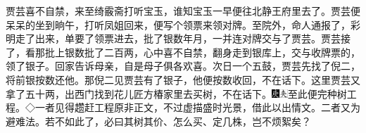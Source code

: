 贾芸喜不自禁，来至绮霰斋打听宝玉，谁知宝玉一早便往北静王府里去了。贾芸便呆呆的坐到晌午，打听凤姐回来，便写个领票来领对牌。至院外，命人通报了，彩明走了出来，单要了领票进去，批了银数年月，一并连对牌交与了贾芸。贾芸接了，看那批上银数批了二百两，心中喜不自禁，翻身走到银库上，交与收牌票的，领了银子。回家告诉母亲，自是母子俱各欢喜。次日一个五鼓，贾芸先找了倪二，将前银按数还他。那倪二见贾芸有了银子，他便按数收回，不在话下。这里贾芸又拿了五十两，出西门找到花儿匠方椿家里去买树，不在话下。{\includegraphics[width=3mm]{../Images/00004}\includegraphics[width=3mm]{../Images/00012}\footnotesize \kaishu 至此便完种树工程。◇一者见得趱赶工程原非正文，不过虚描盛时光景，借此以出情文。二者又为避难法。若不如此了，必曰其树其价、怎么买、定几株，岂不烦絮矣？}

